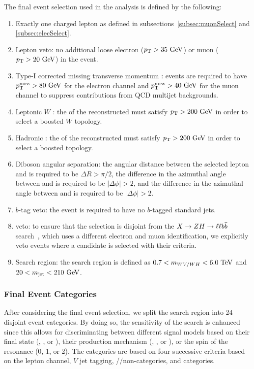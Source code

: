 The final event selection used in the analysis is defined by the following:
\begin{enumerate}
  \item Exactly one charged lepton as defined in subsections~\ref{subsec:muonSelect} and \ref{subsec:elecSelect}.
  \item Lepton veto: no additional loose electron ($\pt>35\unit{GeV}$) or muon ($\pt>20\unit{GeV}$) in the event.
  \item Type-I corrected missing transverse momentum \ptmissTI: events are required to have $\ptmiss>80\unit{GeV}$ for the electron channel and $\ptmiss>40\unit{GeV}$ for the muon channel to suppress contributions from QCD multijet backgrounds.
  \item Leptonic $W$ \pt: the \pt of the reconstructed \Wlep must satisfy $\pt>200\unit{GeV}$ in order to select a boosted $W$ topology.
  \item Hadronic \VorH \pt: the \pt of the reconstructed \Vhad must satisfy $\pt>200\unit{GeV}$ in order to select a boosted \VorH topology.
  \item Diboson angular separation: the angular distance between the selected lepton and \Vhad is required to be $\Delta R>\pi/2$, the difference in the azimuthal angle between \Vhad and \ptmissTI is required to be $|\Delta\phi|>2$, and the difference in the azimuthal angle between \Vhad and \Wlep is required to be $|\Delta\phi|>2$.
  \item $b$-tag veto: the event is required to have no $b$-tagged standard jets.
  \item \ZH veto: to ensure that the selection is disjoint from the $X\to\ZH\to\ell\ell\bbbar$ search~\cite{CMS-PAS-B2G-19-006}, which uses a different electron and muon identification, we explicitly veto events where a \ZH candidate is selected with their criteria.
  \item Search region: the search region is defined as $0.7<\MVV<6.0\unit{TeV}$ and $20<\MJ<210\unit{GeV}$.
\end{enumerate}

\subsubsection{Final Event Categories}
\label{subsec:eventCat}

After considering the final event selection, we split the search region into 24 disjoint event categories.
By doing so, the sensitivity of the search is enhanced since this allows for discriminating between different signal models based on their final state (\WW, \WZ, or \WH), their production mechanism (\ggF, \DY, or \VBF), or the spin of the resonance (0, 1, or 2).
The categories are based on four successive criteria based on the lepton channel, $V$ jet tagging, \VBF/\bbbar/non-\bbbar categories, and \Dy categories.


